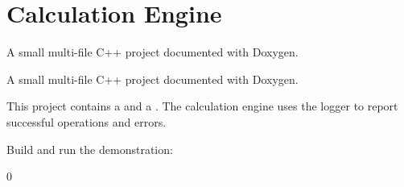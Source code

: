 \chapter{Calculation Engine }
\hypertarget{index}{}\label{index}
A small multi-\/file C++ project documented with Doxygen.

A small multi-\/file C++ project documented with Doxygen.  

This project contains a  and a . The calculation engine uses the logger to report successful operations and errors.

Build and run the demonstration: 
\begin{DoxyCode}{0}

\end{DoxyCode}
 